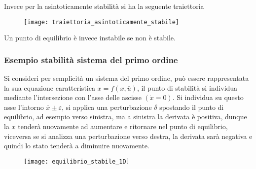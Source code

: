 Invece per la asintoticamente stabilità si ha la seguente traiettoria
\begin{figure}[h]
\centering
\texttt{[image: traiettoria\_asintoticamente\_stabile]}
\end{figure}

Un punto di equilibrio è invece instabile se non è stabile.

\subsubsection{Esempio stabilità sistema del primo ordine}
Si consideri per semplicità un sistema del primo ordine, può essere
rappresentata la sua equazione caratteristica
$\dot{x} = f(x,\overline{u})$, il punto di stabilità si individua mediante
l'intersezione con l'asse delle ascisse $(\dot{x}=0)$. Si individua su questo
asse l'intorno $\overline{x} \pm \varepsilon$,
si applica una perturbazione $\delta$ spostando il punto di equilibrio, ad
esempio verso sinistra, ma a sinistra la derivata è positiva, dunque la $x$
tenderà nuovamente ad aumentare e ritornare nel punto di equilibrio, viceversa
se si analizza una perturbazione verso destra, la
derivata sarà negativa e quindi lo stato tenderà a diminuire nuovamente.
\begin{figure}[h]
\centering
\texttt{[image: equilibrio\_stabile\_1D]}
\end{figure}

